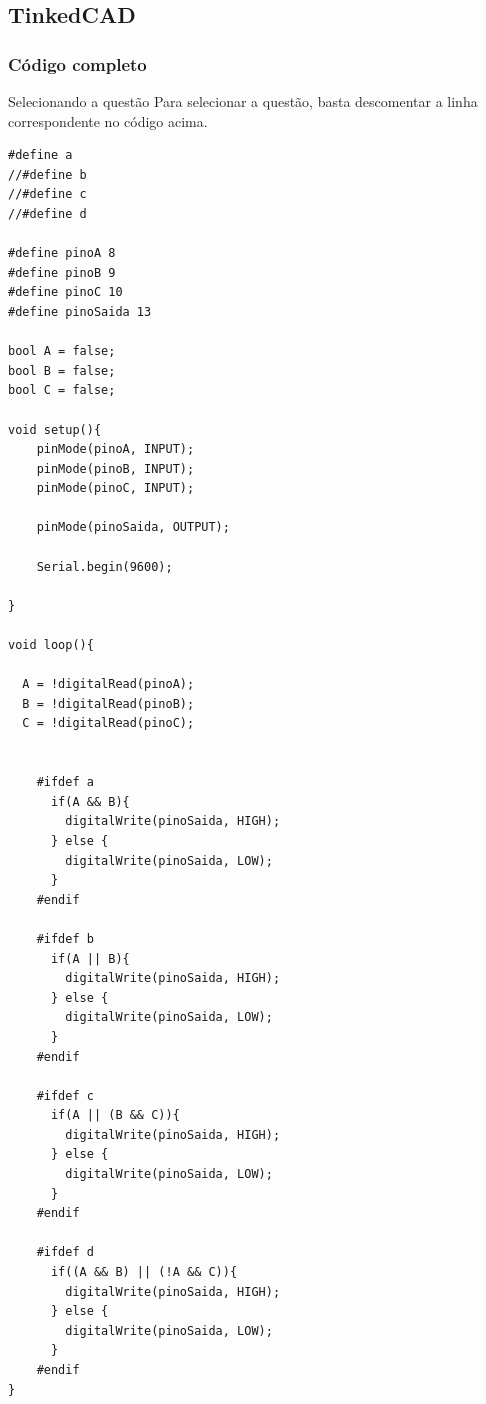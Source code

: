 \documentclass[12pt, a4paper]{article}
\begin{document}
\newpage
\subsection{TinkedCAD}
\subsubsection*{Código completo}
\begin{mybox}{Selecionando a questão}
	Para selecionar a questão, basta descomentar a linha correspondente no código acima.
\end{mybox}
\begin{verbatim}
#define a
//#define b
//#define c
//#define d

#define pinoA 8
#define pinoB 9
#define pinoC 10
#define pinoSaida 13

bool A = false;
bool B = false;
bool C = false;

void setup(){
	pinMode(pinoA, INPUT);
	pinMode(pinoB, INPUT);
	pinMode(pinoC, INPUT);

 	pinMode(pinoSaida, OUTPUT);
  	
  	Serial.begin(9600);

}

void loop(){
  
  A = !digitalRead(pinoA);
  B = !digitalRead(pinoB);
  C = !digitalRead(pinoC);

  
    #ifdef a
      if(A && B){
        digitalWrite(pinoSaida, HIGH);
      } else {
        digitalWrite(pinoSaida, LOW);
      }
    #endif

    #ifdef b
  	  if(A || B){
        digitalWrite(pinoSaida, HIGH);
      } else {
        digitalWrite(pinoSaida, LOW);
      }
    #endif

    #ifdef c
      if(A || (B && C)){
        digitalWrite(pinoSaida, HIGH);
      } else {
        digitalWrite(pinoSaida, LOW);
      }
    #endif

    #ifdef d
      if((A && B) || (!A && C)){
        digitalWrite(pinoSaida, HIGH);
      } else {
        digitalWrite(pinoSaida, LOW);
      }
    #endif
}
\end{verbatim}
\end{document}

